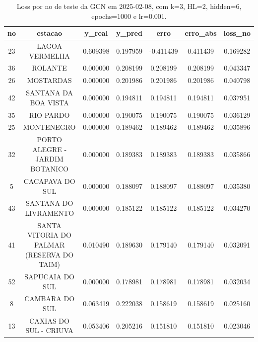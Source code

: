 \begin{table}[h]
\centering
\caption{Loss por no de teste da GCN em 2025-02-08, com k=3, HL=2, hidden=6, epochs=1000 e lr=0.001.}
\label{tab:gcn_loss_k3_hl2_h6_e1000_d20250208}
\begin{tabular}{ccccccc}
\toprule
no & estacao & y\_real & y\_pred & erro & erro\_abs & loss\_no \\
\midrule
23 & LAGOA VERMELHA & 0.609398 & 0.197959 & -0.411439 & 0.411439 & 0.169282 \\
36 & ROLANTE & 0.000000 & 0.208199 & 0.208199 & 0.208199 & 0.043347 \\
26 & MOSTARDAS & 0.000000 & 0.201986 & 0.201986 & 0.201986 & 0.040798 \\
42 & SANTANA DA BOA VISTA & 0.000000 & 0.194811 & 0.194811 & 0.194811 & 0.037951 \\
35 & RIO PARDO & 0.000000 & 0.190075 & 0.190075 & 0.190075 & 0.036129 \\
25 & MONTENEGRO & 0.000000 & 0.189462 & 0.189462 & 0.189462 & 0.035896 \\
32 & PORTO ALEGRE - JARDIM BOTANICO & 0.000000 & 0.189383 & 0.189383 & 0.189383 & 0.035866 \\
5 & CACAPAVA DO SUL & 0.000000 & 0.188097 & 0.188097 & 0.188097 & 0.035380 \\
43 & SANTANA DO LIVRAMENTO & 0.000000 & 0.185122 & 0.185122 & 0.185122 & 0.034270 \\
41 & SANTA VITORIA DO PALMAR (RESERVA DO TAIM) & 0.010490 & 0.189630 & 0.179140 & 0.179140 & 0.032091 \\
52 & SAPUCAIA DO SUL & 0.000000 & 0.178981 & 0.178981 & 0.178981 & 0.032034 \\
8 & CAMBARA DO SUL & 0.063419 & 0.222038 & 0.158619 & 0.158619 & 0.025160 \\
13 & CAXIAS DO SUL - CRIUVA & 0.053406 & 0.205216 & 0.151810 & 0.151810 & 0.023046 \\
\bottomrule
\end{tabular}
\end{table}
